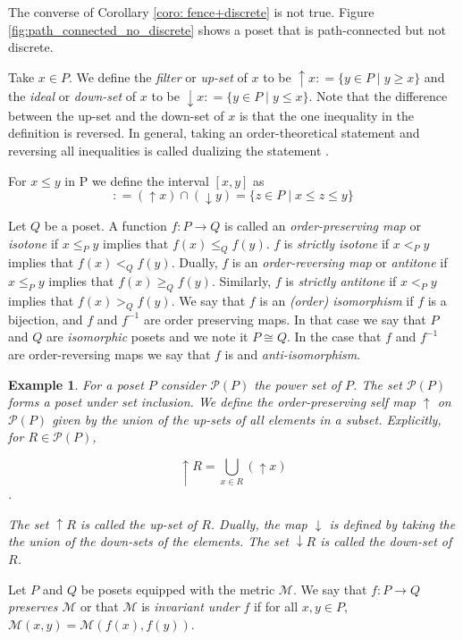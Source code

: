 \documentclass{article}[12pt]
\theoremstyle{exampstyle}
\newtheorem{example}[theorem]{Example}
\theoremstyle{remark}
\renewcommand{\P}{\mathcal{P}}
\begin{document}
The converse of Corollary \ref{coro: fence+discrete} is not true. Figure \ref{fig:path_connected_no_discrete} shows a poset that is path-connected but not discrete.


Take $x \in P$. We define the \textit{ filter} or \textit{up-set} of $x$ to be $\uparrow x : = \{y \in P \mid y \geq x \}$ and the \textit{ideal} or \textit{down-set} of $x$ to be $\downarrow x : = \{y \in P \mid y \leq x \}$. Note that the difference between the up-set and the down-set of $x$ is that the one inequality in the definition is reversed.
In general, taking an order-theoretical statement and reversing all inequalities is called dualizing the statement .

For $x \leq y$ in P we define the interval $[x,y]$ as
\begin{equation*}
    [x,y] : = (\uparrow x) \cap (\downarrow y) = \{ z \in P \mid x \leq z \leq y \}
\end{equation*}

Let $Q$ be a poset.  A function $f: P \to Q$ is called an \textit{order-preserving map} or \textit{isotone} if $x \leq_P y$  implies that $f(x) \leq_Q f(y)$. $f$ is \textit{strictly isotone} if $x <_P y$  implies that $f(x) <_Q f(y)$. Dually, $f$ is an \textit{order-reversing map} or \textit{antitone} if $x \leq_P y$  implies that $f(x) \geq_Q f(y)$. Similarly, $f$ is \textit{strictly antitone} if $x <_P y$  implies that $f(x) >_Q f(y)$. We say that $f$ is an \textit{(order) isomorphism} if $f$ is a bijection, and $f$ and  $f^{-1}$ are order preserving maps. In that case we say that $P$ and $Q$ are \textit{isomorphic} posets and we note it $P \cong Q$.  In the case that $f$ and $f^{-1}$ are order-reversing maps we say that $f$ is and \textit{anti-isomorphism}.


\begin{example}
    For a poset $P$ consider $\P(P)$ the power set of $P$.  The set $\P(P)$ forms a poset under set inclusion. We define the order-preserving self map $\uparrow$ on $\P(P)$ given by the union of the up-sets of all elements in a subset. Explicitly, for $R \in \P(P)$,
    
    \[\uparrow R = \bigcup_{x \in R} (\uparrow x)\]. 

    The set $\uparrow R$ is called the up-set of $R$. Dually, the map $\downarrow$ is defined by taking the the union of the down-sets of the elements.  The set $\downarrow R$ is called the down-set of $R$.
\end{example}

Let $P$ and $Q$ be posets equipped with the metric $\mathcal{M}$. We say that $f: P \to Q$ \textit{preserves} $\mathcal{M}$ or that $\mathcal{M}$ is \textit{invariant under} $f$ if for all $x,y \in P$, $\mathcal{M}(x,y) = \mathcal{M}(f(x),f(y))$.
\end{document}
